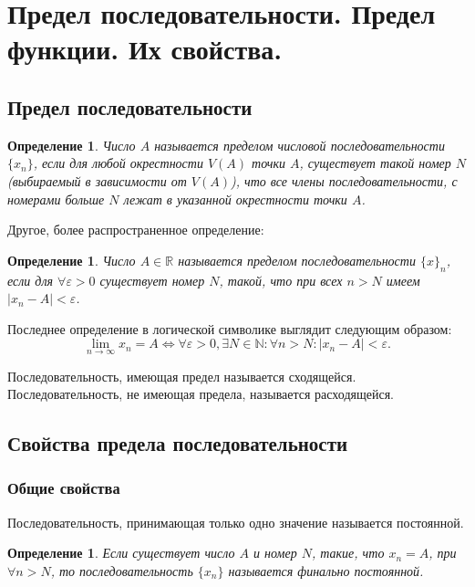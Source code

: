 \documentclass[12pt]{report}
\theoremstyle{plain}
\newtheorem{definition}[theorem]{Определение}
\newcommand{\R}{\mathbb R}
\newcommand{\N}{\mathbb N}
\begin{document}

\section{Предел последовательности. Предел функции. Их свойства.}
\subsection{Предел последовательности}
\begin{definition}
Число $A$ называется пределом числовой последовательности $\{x_n\}$,
если для любой окрестности $V(A)$ точки $A$, существует такой номер $N$
(выбираемый в зависимости от $V(A)$), что все члены последовательности,
с номерами больше $N$ лежат в указанной окрестности точки $A$.
\end{definition}

Другое, более распространенное определение:

\begin{definition}
Число $A \in \R$ называется пределом последовательности $\{x\}_n$, если
для $\forall \varepsilon > 0$ существует номер $N$, такой, что при всех
$n > N$ имеем $|x_n - A| < \varepsilon$.
\end{definition}

Последнее определение в логической символике выглядит следующим образом:
$$
  \lim\limits_{n \rightarrow \infty} x_n = A
    \Leftrightarrow
  \forall \varepsilon > 0, \exists N \in \N: \forall n > N: |x_n - A| < \varepsilon.
$$

Последовательность, имеющая предел называется сходящейся.
Последовательность, не имеющая предела, называется расходящейся.

\subsection{Свойства предела последовательности}

\subsubsection{Общие свойства}
Последовательность, принимающая только одно значение называется постоянной.

\begin{definition}
Если существует число $A$ и номер $N$, такие, что
$x_n = A$, при $\forall n > N$, то последовательность
$\{x_n\}$ называется финально постоянной.
\end{definition}
\end{document}
